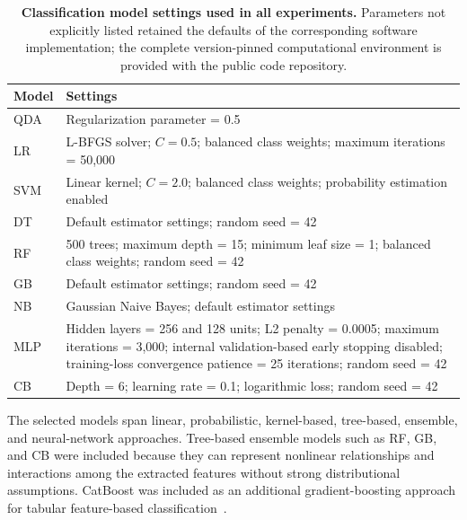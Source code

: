 \documentclass[10pt,letterpaper]{article}
\begin{document}
\begin{table}[!htbp]
\centering
\caption{\textbf{Classification model settings used in all experiments.} Parameters not explicitly listed retained the defaults of the corresponding software implementation; the complete version-pinned computational environment is provided with the public code repository.}
\label{tab:model_settings}
\begin{tabular}{p{} p{}}
\hline
\textbf{Model} & \textbf{Settings} \\
\hline
QDA &
Regularization parameter = 0.5 \\

LR &
L-BFGS solver; $C=0.5$; balanced class weights;
maximum iterations = 50,000 \\

SVM &
Linear kernel; $C=2.0$; balanced class weights;
probability estimation enabled \\

DT &
Default estimator settings; random seed = 42 \\

RF &
500 trees; maximum depth = 15; minimum leaf size = 1;
balanced class weights; random seed = 42 \\

GB &
Default estimator settings; random seed = 42 \\

NB &
Gaussian Naive Bayes; default estimator settings \\

MLP &
Hidden layers = 256 and 128 units; L2 penalty = 0.0005;
maximum iterations = 3,000; internal validation-based early
stopping disabled; training-loss convergence patience = 25 iterations;
random seed = 42 \\

CB &
Depth = 6; learning rate = 0.1; logarithmic loss;
random seed = 42 \\
\hline
\end{tabular}
\end{table}

The selected models span linear, probabilistic, kernel-based, tree-based, ensemble, and neural-network approaches. Tree-based ensemble models such as RF, GB, and CB were included because they can represent nonlinear relationships and interactions among the extracted features without strong distributional assumptions. CatBoost was included as an additional gradient-boosting approach for tabular feature-based classification~\cite{Prokhorenkova2018CatBoost}.
\end{document}
